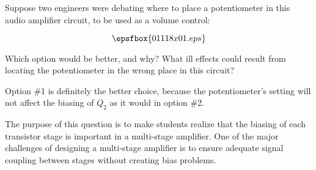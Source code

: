 

Suppose two engineers were debating where to place a potentiometer in this audio amplifier circuit, to be used as a volume control:

$$\epsfbox{01118x01.eps}$$

Which option would be better, and why?  What ill effects could result from locating the potentiometer in the wrong place in this circuit?







Option \#1 is definitely the better choice, because the potentiometer's setting will not affect the biasing of $Q_2$ as it would in option \#2.







The purpose of this question is to make students realize that the biasing of each transistor stage is important in a multi-stage amplifier.  One of the major challenges of designing a multi-stage amplifier is to ensure adequate signal coupling between stages without creating bias problems.




